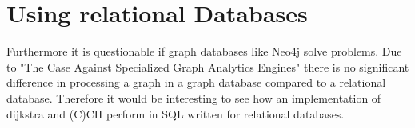 \section{Using relational Databases}

Furthermore it is questionable if graph databases like Neo4j solve problems.
Due to "The Case Against Specialized Graph Analytics Engines" \cite{fan2015case} there is no significant difference in processing a graph in a graph database compared to a relational database.
Therefore it would be interesting to see how an implementation of dijkstra and (C)CH perform in SQL written for relational databases.
